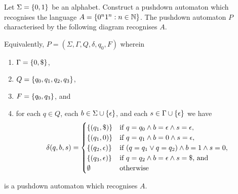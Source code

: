 \Bxr
    Let \(\Sigma = \{0, 1\}\) be an alphabet. Construct a pushdown automaton
    which recognises the language \(A = \{0^n 1^n : n \in \mathbb{N}\}\).
\Exr
\Bsl
    The pushdown automaton \(P\) characterised by the following diagram
    recognises \(A\).
    \begin{figure}[!ht]
        \centering
    \end{figure}

    \noindent Equivalently, \(P = (\Sigma, \Gamma, Q, \delta, q_0, F)\)
    wherein
    \begin{enumerate}
        \item \(\Gamma = \{0, \$\}\),
        \item \(Q = \{q_0, q_1, q_2, q_3\}\),
        \item \(F = \{q_0, q_3\}\), and
        \item for each \(q \in Q\), each \(b \in \Sigma \cup
            \{\epsilon\}\), and each \(s \in \Gamma \cup
            \{\epsilon\}\) we have
            \[
                \delta(q, b, s) = \begin{cases}
                    \{(q_1, \$)\} & \text{if } q = q_0 \land b = \epsilon
                    \land s = \epsilon,\\
                    \{(q_1, 0)\} & \text{if } q = q_1 \land b = 0 \land s =
                    \epsilon,\\
                    \{(q_2, \epsilon)\} & \text{if } (q = q_1 \lor q = q_2)
                    \land b = 1 \land s = 0,\\
                    \{(q_3, \epsilon)\} & \text{if } q = q_2 \land b =
                    \epsilon \land s = \$ \text{, and}\\
                    \emptyset & \text{otherwise}
                \end{cases}
            \]
    \end{enumerate}
    is a pushdown automaton which recognises \(A\).
\Esl

